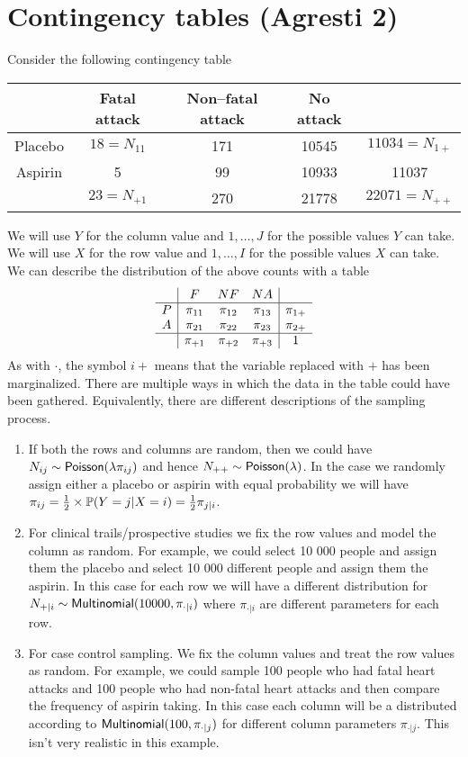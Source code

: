 \section{Contingency tables (Agresti 2)}
Consider the following contingency table
\begin{center}
    \begin{tabular}{c|ccc|c}
        &Fatal attack&Non--fatal attack&No attack&\\
        \hline
        Placebo&$18=N_{11}$&171&10545&$11034=N_{1+}$\\
        Aspirin&5&99&10933&11037\\
        \hline
        &$23=N_{+1}$&270&21778&$22071=N_{++}$
    \end{tabular}
\end{center}
We will use $Y$ for the column value and $1,\ldots,J$ for the possible values $Y$ can take. We will use $X$ for the row value and $1,\ldots,I$ for the possible values $X$ can take. We can describe the distribution of the above counts with a table
\[\begin{array}{c|ccc|c}
    &F&NF&NA&\\
    \hline
    P&\pi_{11}&\pi_{12}&\pi_{13}&\pi_{1+}\\
    A&\pi_{21}&\pi_{22}&\pi_{23}&\pi_{2+}\\
    \hline
    &\pi_{+1}&\pi_{+2}&\pi_{+3}&1    
\end{array}\]
As with $\cdot$, the symbol $i+$ means that the variable replaced with $+$ has been marginalized. There are multiple ways in which the data in the table could have been gathered. Equivalently, there are different descriptions of the sampling process.
\begin{enumerate}
    \item If both the rows and columns are random, then we could have $N_{ij} \sim \mathsf{Poisson}(\lambda\pi_{ij})$ and hence $N_{++} \sim \mathsf{Poisson}(\lambda)$. In the case we randomly assign either a placebo or aspirin with equal probability we will have $\pi_{ij} = \frac{1}{2}\times {\mathbb{P}}(Y=j|X=i) = \frac{1}{2}\pi_{j|i}$.
    \item For clinical trails/prospective studies we fix the row values and model the column as random. For example, we could select 10 000 people and assign them the placebo and select 10 000 different people and assign them the aspirin. In this case for each row we will have a different distribution for $N_{+|i} \sim \mathsf{Multinomial}(10000, \pi_{\cdot|i})$ where $\pi_{\cdot|i}$ are different parameters for each row.
    \item For case control sampling. We fix the column values and treat the row values as random. For example, we could sample 100 people who had fatal heart attacks and 100 people who had non-fatal heart attacks and then compare the frequency of aspirin taking. In this case each column will be a distributed according to $\mathsf{Multinomial}(100, \pi_{\cdot |j})$ for different column parameters $\pi_{\cdot|j}$. This isn't very realistic in this example.
\end{enumerate}
